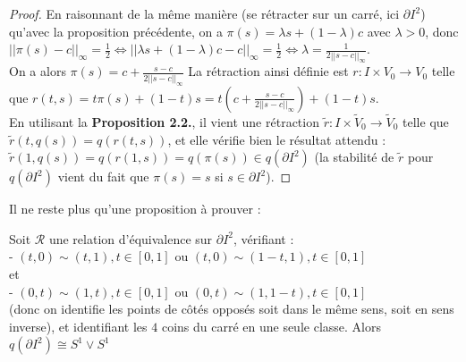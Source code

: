 \begin{proof}
    En raisonnant de la même manière (se rétracter sur un carré, ici $\partial I^2$) qu'avec la proposition précédente, on a $\pi(s)=\lambda s+(1-\lambda)c$ avec $\lambda>0$, donc $||\pi(s)-c||_{\infty}=\frac{1}{2}\iff||\lambda s+(1-\lambda)c-c||_{\infty}=\frac{1}{2}\iff\lambda=\displaystyle\frac{1}{2||s-c||_{\infty}}$.\\
    On a alors $\pi(s)=c+\displaystyle\frac{s-c}{2||s-c||_{\infty}}$
    La rétraction ainsi définie est $r:I\times V_0\rightarrow V_0$ telle que $r(t,s)=t\pi(s)+(1-t)s=t\left(c+\displaystyle\frac{s-c}{2||s-c||_{\infty}}\right)+(1-t)s$.\medskip\\
    En utilisant la \textbf{Proposition 2.2.}, il vient une rétraction $\tilde{r}:I\times\tilde{V}_0\rightarrow\tilde{V}_0$ telle que $\tilde{r}(t,q(s))=q(r(t,s))$, et elle vérifie bien le résultat attendu : $\tilde{r}(1,q(s))=q(r(1,s))=q(\pi(s))\in q(\partial I^2)$ (la stabilité de $\tilde{r}$ pour $q(\partial I^2)$ vient du fait que $\pi(s)=s$ si $s\in\partial I^2$).
\end{proof}
Il ne reste plus qu'une proposition à prouver :
\begin{proposition}
    Soit $\mathcal{R}$ une relation d'équivalence sur $\partial I^2$, vérifiant :\\
    - $(t,0)\sim(t,1), t\in[0,1]$ ou $(t,0)\sim(1-t,1),t\in[0,1]$\\
    et\\
    - $(0,t)\sim(1,t),t\in[0,1]$ ou $(0,t)\sim(1,1-t),t\in[0,1]$\\
    (donc on identifie les points de côtés opposés soit dans le même sens, soit en sens inverse), et identifiant les $4$ coins du carré en une seule classe. Alors $q(\partial I^2)\cong S^1\vee S^1$
\end{proposition}
